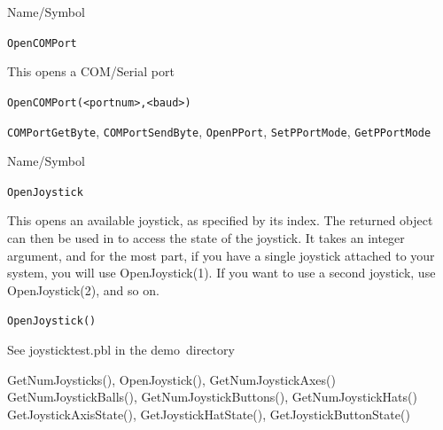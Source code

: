 \vfill
\newpage
{}
\vfill


\begin{desc}{Name/Symbol}
\item[Name/Symbol] \verb+OpenCOMPort+ 

\item[Description]  
  This opens a COM/Serial port
\item[Usage]       
     \verb+OpenCOMPort(<portnum>,<baud>)+ 

\item[Example]

\item[See Also]
\verb+COMPortGetByte+, \verb+COMPortSendByte+, \verb+OpenPPort+, \verb+SetPPortMode+, \verb+GetPPortMode+ 
\end{desc} 




\begin{desc}{Name/Symbol}
\item[Name/Symbol] \verb+OpenJoystick+ 

\item[Description]  
  This opens an available joystick, as specified by its index.  The returned object can then be used in to access the state of the joystick.  It takes an integer argument, and for the most part, if you have a single joystick attached to your system, you will use OpenJoystick(1).  If you want to use a second joystick, use OpenJoystick(2), and so on.
  
  \item[Usage]          \verb+OpenJoystick()+ 

\item[Example]
See joysticktest.pbl in the demo\ directory

\item[See Also]
GetNumJoysticks(), OpenJoystick(), GetNumJoystickAxes()
GetNumJoystickBalls(), GetNumJoystickButtons(), GetNumJoystickHats()
GetJoystickAxisState(), GetJoystickHatState(), GetJoystickButtonState()
\end{desc} 


